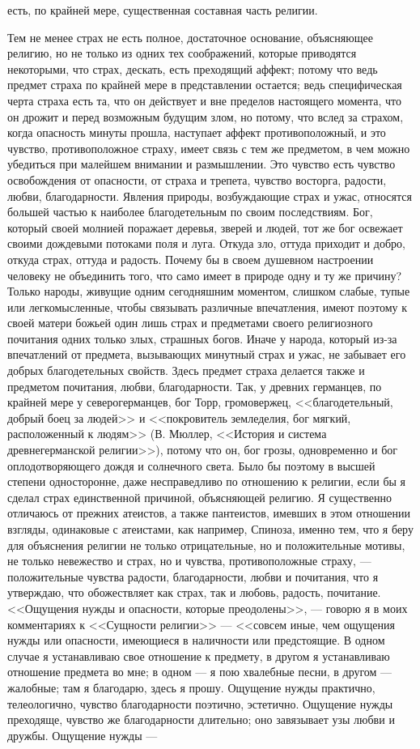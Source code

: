 \documentclass[12pt]{article}
\begin{document}
есть, по крайней мере, существенная составная часть религии. 

Тем не менее страх не есть полное, достаточное основание, объясняющее религию, но не только из одних тех соображений, которые приводятся некоторыми, что страх, дескать, есть преходящий аффект; потому что ведь предмет страха по крайней мере в представлении остается; ведь специфическая черта страха есть та, что он действует и вне пределов настоящего момента, что он дрожит и перед возможным будущим злом, но потому, что вслед за страхом, когда опасность минуты прошла, наступает аффект противоположный, и это чувство, противоположное страху, имеет связь с тем же предметом, в чем можно убедиться при малейшем внимании и размышлении. Это чувство есть чувство освобождения от опасности, от страха и трепета, чувство восторга, радости, любви, благодарности. Явления природы, возбуждающие страх и ужас, относятся большей частью к наиболее благодетельным по своим последствиям. Бог, который своей молнией поражает деревья, зверей и людей, тот же бог освежает своими дождевыми потоками поля и луга. Откуда зло, оттуда приходит и добро, откуда страх, оттуда и радость. Почему бы в своем душевном настроении человеку не объединить того, что само имеет в природе одну и ту же причину? Только народы, живущие одним сегодняшним моментом, слишком слабые, тупые или легкомысленные, чтобы связывать различные впечатления, имеют поэтому к своей матери божьей один лишь страх и предметами своего религиозного почитания одних только злых, страшных богов. Иначе у народа, который из-за впечатлений от предмета, вызывающих минутный страх и ужас, не забывает его добрых благодетельных свойств. Здесь предмет страха делается также и предметом почитания, любви, благодарности. Так, у древних германцев, по крайней мере у северогерманцев, бог Торр, громовержец, <<благодетельный, добрый боец за людей>> и <<покровитель земледелия, бог мягкий, расположенный к людям>> (В. Мюллер, <<История и система древнегерманской религии>>), потому что он, бог грозы, одновременно и бог оплодотворяющего дождя и солнечного света. Было бы поэтому в высшей степени односторонне, даже несправедливо по отношению к религии, если бы я сделал страх единственной причиной, объясняющей религию. Я существенно отличаюсь от прежних атеистов, а также пантеистов, имевших в этом отношении взгляды, одинаковые с атеистами, как например, Спиноза, именно тем, что я беру для объяснения религии не только отрицательные, но и положительные мотивы, не только невежество и страх, но и чувства, противоположные страху, --- положительные чувства радости, благодарности, любви и почитания, что я утверждаю, что обожествляет как страх, так и любовь, радость, почитание. <<Ощущения нужды и опасности, которые преодолены>>, --- говорю я в моих комментариях к <<Сущности религии>>  --- <<совсем иные, чем ощущения нужды или опасности, имеющиеся в наличности или предстоящие. В одном случае я устанавливаю свое отношение к предмету, в другом я устанавливаю отношение предмета во мне; в одном --- я пою хвалебные песни, в другом --- жалобные; там я благодарю, здесь я прошу. Ощущение нужды практично, телеологично, чувство благодарности поэтично, эстетично. Ощущение нужды преходяще, чувство же благодарности длительно; оно завязывает узы любви и дружбы. Ощущение нужды --- 
\end{document}
